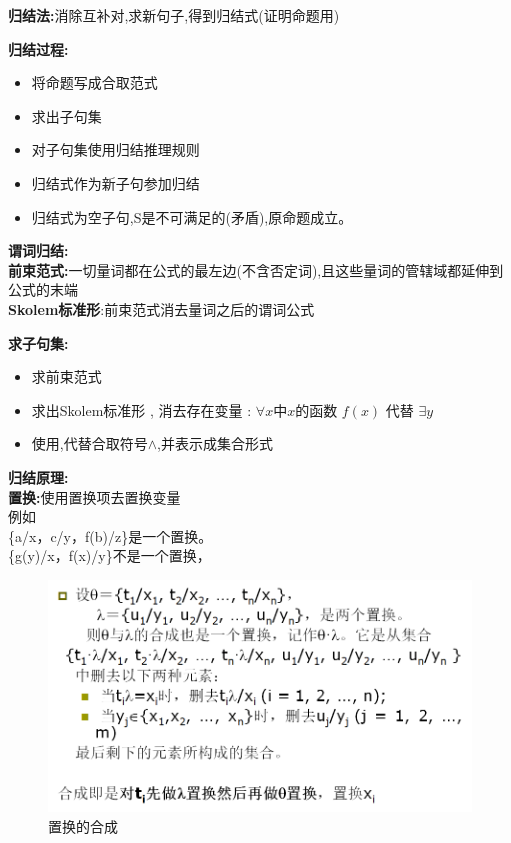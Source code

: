 \documentclass[UTF8,a4paper]{ctexart}
\begin{document}
\textbf{归结法:}消除互补对,求新句子,得到归结式(证明命题用)

\textbf{归结过程:}
\begin{itemize}
	\item 将命题写成合取范式
	\item 求出子句集
	\item 对子句集使用归结推理规则
	\item 归结式作为新子句参加归结
	\item 归结式为空子句,S是不可满足的(矛盾),原命题成立。
\end{itemize}

\textbf{谓词归结:}\\
\textbf{前束范式:}一切量词都在公式的最左边(不含否定词),且这些量词的管辖域都延伸到公式的末端\\
\textbf{Skolem标准形}:前束范式消去量词之后的谓词公式

\textbf{求子句集:}
\begin{itemize}
	\item 求前束范式
	\item 求出Skolem标准形 , 消去存在变量 : $\forall x$中$x$的函数 $f(x)$ 代替 $\exists y$
	\item 使用,代替合取符号$\land$,并表示成集合形式
\end{itemize}

\textbf{归结原理:}\\
\textbf{置换:}使用置换项去置换变量\\
例如\\
\{a/x，c/y，f(b)/z\}是一个置换。\\
\{g(y)/x，f(x)/y\}不是一个置换， \\

\begin{figure}[H]
	\centering
	\includegraphics[scale = 0.3]{assets/ArtificialIntelligence_3ac55.png}
	\caption{置换的合成}
\end{figure}
\end{document}
